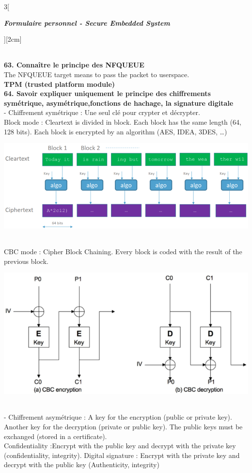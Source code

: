 \begin{multicols}{3}[\centerline{ \large\em \textbf{Formulaire personnel - Secure Embedded System}}][2cm]
\begin{minipage}{\linewidth}
\end{minipage}
\\ \textbf{63. Connaître le principe des NFQUEUE\\}
The NFQUEUE target means to pass the packet to userspace.\\
{\Large \textbf{TPM (trusted platform module)}}
\\ \textbf{64. Savoir expliquer uniquement le principe des chiffrements symétrique, asymétrique,fonctions de hachage, la signature digitale\\}
- Chiffrement symétrique : Une seul clé pour crypter et décrypter. \\
Block mode : Cleartext is divided in block. Each block has the same length (64, 128 bits). Each block is encrypted by an algorithm (AES, IDEA, 3DES, …)\\
\begin{minipage}{\linewidth}
	\centering
    \includegraphics[width =0.6\columnwidth]{images/45.png}
\end{minipage}\\
CBC mode : Cipher Block Chaining. Every block is coded with the result of the previous block.\\
\begin{minipage}{\linewidth}
	\centering
    \includegraphics[width =0.6\columnwidth]{images/46.png}
\end{minipage}\\
- Chiffrement asymétrique : A key for the encryption (public or private key). Another key for the decryption (private or public key). The public keys must be exchanged (stored in a certificate).\\
Confidentiality :Encrypt with the public key and decrypt with the private key (confidentiality, integrity). Digital signature : Encrypt with the private key and decrypt with the public key (Authenticity, integrity)

\end{multicols}
